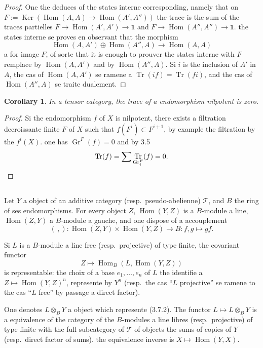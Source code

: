 \documentclass[11pt,a4paper]{article}
\theoremstyle{plain}
\newtheorem{corollary}[theorem]{Corollary}
\theoremstyle{definition}
\DeclareMathOperator{\Hom}{Hom}
\DeclareMathOperator{\Ker}{Ker}
\DeclareMathOperator{\Tr}{Tr}
\DeclareMathOperator{\Gr}{Gr}
\begin{document}
\begin{proof}
One the deduces of the states interne corresponding, namely that on $F := \Ker(\Hom(A, A) \to \Hom(A', A''))$ the trace is the sum of the traces partielles $F \to \Hom(A', A') \to \mathbf{1}$ and $F \to \Hom(A'', A'') \to \mathbf{1}$. the states interne se proves en observant that the morphism
\[
\Hom(A, A') \oplus \Hom(A'', A) \to \Hom(A, A)
\]
a for image $F$, of sorte that it is enough to prouver the states interne with $F$ remplace by $\Hom(A, A')$ and by $\Hom(A'', A)$. Si $i$ is the inclusion of $A'$ in $A$, the cas of $\Hom(A, A')$ se ramene a $\Tr(if) = \Tr(fi)$, and the cas of $\Hom(A'', A)$ se traite dualement.
\end{proof}

\begin{corollary}
In a tensor category, the trace of a endomorphism nilpotent is zero.
\end{corollary}

\begin{proof}
Si the endomorphism $f$ of $X$ is nilpotent, there exists a filtration decroissante finite $F$ of $X$ such that $f(F^i) \subset F^{i+1}$, by example the filtration by the $f^i(X)$. one has $\Gr^F(f) = 0$ and by 3.5
\[
\Tr(f) = \sum \Tr_{\Gr^F_i}(f) = 0. \qedhere
\]
\end{proof}

\subsection{}
Let $Y$ a object of an additive category (resp.~pseudo-abelienne) $\mathcal{T}$, and $B$ the ring of ses endomorphisms. For every object $Z$, $\Hom(Y, Z)$ is a $B$-module a line, $\Hom(Z, Y)$ a $B$-module a gauche, and one dispose of a accouplement
\begin{equation}
(\,,) : \Hom(Z, Y) \times \Hom(Y, Z) \to B : f, g \longmapsto gf. \tag{3.7.1}
\end{equation}

Si $L$ is a $B$-module a line free (resp.~projective) of type finite, the covariant functor
\begin{equation}
Z \longmapsto \Hom_B(L, \Hom(Y, Z)) \tag{3.7.2}
\end{equation}
is representable: the choix of a base $e_1, \ldots, e_n$ of $L$ the identifie a $Z \mapsto \Hom(Y, Z)^n$, represente by $Y^n$ (resp.~the cas ``$L$ projective'' se ramene to the cas ``$L$ free'' by passage a direct factor).

One denotes $L \otimes_B Y$ a object which represente (3.7.2). The functor $L \mapsto L \otimes_B Y$ is a equivalence of the category of the $B$-modules a line libres (resp.~projective) of type finite with the full subcategory of $\mathcal{T}$ of objects the sums of copies of $Y$ (resp.~direct factor of sums). the equivalence inverse is $X \mapsto \Hom(Y, X)$.
\end{document}
